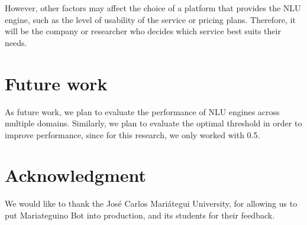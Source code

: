 \documentclass[conference]{IEEEtran}
\begin{document}
However, other factors may affect the choice of a platform that provides the NLU engine, such as the level of usability of the service or pricing plans. Therefore, it will be the company or researcher who decides which service best suits their needs.

\section{Future work}

As future work, we plan to evaluate the performance of NLU engines across multiple domains. Similarly, we plan to evaluate the optimal threshold in order to improve performance, since for this research, we only worked with 0.5.


\section*{Acknowledgment}

We would like to thank the José Carlos Mariátegui University, for allowing us to put Mariateguino Bot into production, and its students for their feedback.



\end{document}
